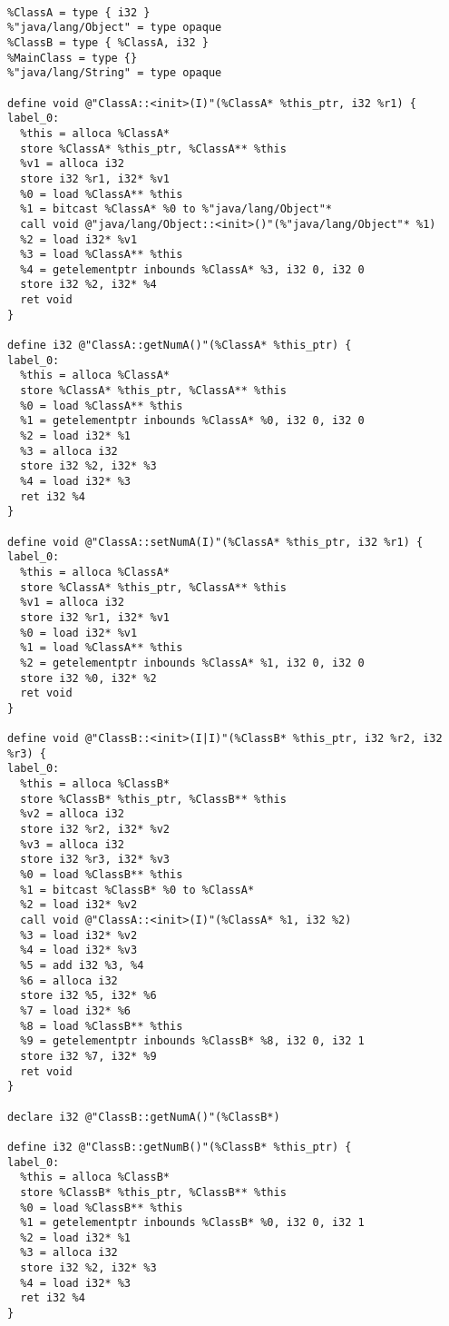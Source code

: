 \begin{lstlisting}[frame=single, title= LLVM IR]

%ClassA = type { i32 }
%"java/lang/Object" = type opaque
%ClassB = type { %ClassA, i32 }
%MainClass = type {}
%"java/lang/String" = type opaque

define void @"ClassA::<init>(I)"(%ClassA* %this_ptr, i32 %r1) {
label_0:
  %this = alloca %ClassA*
  store %ClassA* %this_ptr, %ClassA** %this
  %v1 = alloca i32
  store i32 %r1, i32* %v1
  %0 = load %ClassA** %this
  %1 = bitcast %ClassA* %0 to %"java/lang/Object"*
  call void @"java/lang/Object::<init>()"(%"java/lang/Object"* %1)
  %2 = load i32* %v1
  %3 = load %ClassA** %this
  %4 = getelementptr inbounds %ClassA* %3, i32 0, i32 0
  store i32 %2, i32* %4
  ret void
}

define i32 @"ClassA::getNumA()"(%ClassA* %this_ptr) {
label_0:
  %this = alloca %ClassA*
  store %ClassA* %this_ptr, %ClassA** %this
  %0 = load %ClassA** %this
  %1 = getelementptr inbounds %ClassA* %0, i32 0, i32 0
  %2 = load i32* %1
  %3 = alloca i32
  store i32 %2, i32* %3
  %4 = load i32* %3
  ret i32 %4
}

define void @"ClassA::setNumA(I)"(%ClassA* %this_ptr, i32 %r1) {
label_0:
  %this = alloca %ClassA*
  store %ClassA* %this_ptr, %ClassA** %this
  %v1 = alloca i32
  store i32 %r1, i32* %v1
  %0 = load i32* %v1
  %1 = load %ClassA** %this
  %2 = getelementptr inbounds %ClassA* %1, i32 0, i32 0
  store i32 %0, i32* %2
  ret void
}

define void @"ClassB::<init>(I|I)"(%ClassB* %this_ptr, i32 %r2, i32 %r3) {
label_0:
  %this = alloca %ClassB*
  store %ClassB* %this_ptr, %ClassB** %this
  %v2 = alloca i32
  store i32 %r2, i32* %v2
  %v3 = alloca i32
  store i32 %r3, i32* %v3
  %0 = load %ClassB** %this
  %1 = bitcast %ClassB* %0 to %ClassA*
  %2 = load i32* %v2
  call void @"ClassA::<init>(I)"(%ClassA* %1, i32 %2)
  %3 = load i32* %v2
  %4 = load i32* %v3
  %5 = add i32 %3, %4
  %6 = alloca i32
  store i32 %5, i32* %6
  %7 = load i32* %6
  %8 = load %ClassB** %this
  %9 = getelementptr inbounds %ClassB* %8, i32 0, i32 1
  store i32 %7, i32* %9
  ret void
}

declare i32 @"ClassB::getNumA()"(%ClassB*)

define i32 @"ClassB::getNumB()"(%ClassB* %this_ptr) {
label_0:
  %this = alloca %ClassB*
  store %ClassB* %this_ptr, %ClassB** %this
  %0 = load %ClassB** %this
  %1 = getelementptr inbounds %ClassB* %0, i32 0, i32 1
  %2 = load i32* %1
  %3 = alloca i32
  store i32 %2, i32* %3
  %4 = load i32* %3
  ret i32 %4
}


\end{lstlisting}
